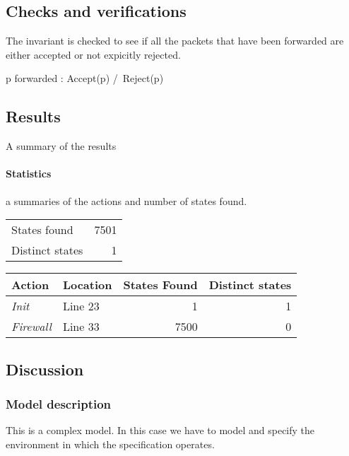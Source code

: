 \documentclass[12pt]{article}
\begin{document}
\subsection{Checks and verifications}
The invariant is checked to see if all the packets that have been forwarded
are either accepted or not expicitly rejected.
\begin{tla}
	\A p \in forwarded : Accept(p) /\ \lnot Reject(p)
\end{tla}
\begin{tlatex}
\end{tlatex}

\subsection{Results} A summary of the results
\paragraph{Statistics} a summaries of the actions and number of states
found.

\begin{table}[h]
\begin{tabular}{lr}
	States found & \num{7501} \\
 Distinct states & \num{1} \\ 
\end{tabular}
\end{table}

\begin{table}[h]
\begin{tabular}{llrr}
	\textbf{Action} & Location & States Found & \textbf{Distinct states} \\
	\hline
	\textit{Init}   & Line 23 & 1 & 1 \\
	\textit{Firewall}   & Line 33 & \num{7500} & 0 \\
\end{tabular}
\end{table}

\subsection{Discussion}
\subsubsection{Model description} 
This is a complex model.  In this case we have to model and specify the
environment in which the specification operates.
\end{document}
